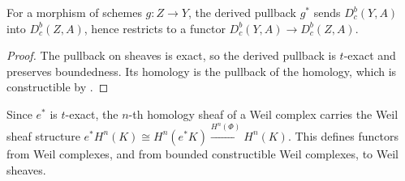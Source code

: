 \begin{lemma}
\label{lem:weil-constructible-pullback}
\leanok
For a morphism of schemes \(g\colon Z\to Y\), the derived pullback \(g^*\) sends
\(D^b_c(Y,A)\) into \(D^b_c(Z,A)\), hence restricts to a functor
\(D^b_c(Y,A)\to D^b_c(Z,A)\).
\end{lemma}
\begin{proof}
\leanok
The pullback on sheaves is exact, so the derived pullback is \(t\)-exact and
preserves boundedness.  Its homology is the pullback of the homology, which is
constructible by .
\end{proof}

\begin{definition}\label{def:weil-homology}
\leanok
Since \(e^*\) is \(t\)-exact, the \(n\)-th homology sheaf of a Weil complex
carries the Weil sheaf structure
\(e^*H^n(K)\cong H^n(e^*K)\xrightarrow{H^n(\Phi)}H^n(K)\).  This defines functors
from Weil complexes, and from bounded constructible Weil complexes, to Weil
sheaves.
\end{definition}
